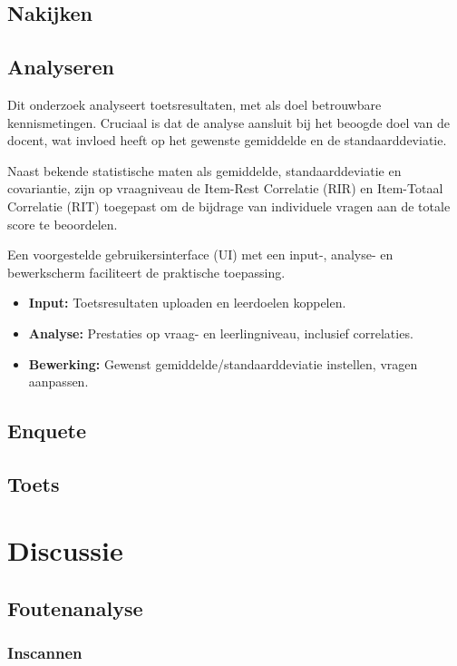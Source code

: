 \documentclass[12pt]{article}
\begin{document}
\subsection{Nakijken}


\subsection{Analyseren}
\begin{multicols}{2}
Dit onderzoek analyseert toetsresultaten, met als doel betrouwbare kennismetingen. Cruciaal is dat de analyse aansluit bij het beoogde doel van de docent, wat invloed heeft op het gewenste gemiddelde en de standaarddeviatie.

Naast bekende statistische maten als gemiddelde, standaarddeviatie en covariantie, zijn op vraagniveau de Item-Rest Correlatie (RIR) en Item-Totaal Correlatie (RIT) toegepast om de bijdrage van individuele vragen aan de totale score te beoordelen.

Een voorgestelde gebruikersinterface (UI) met een input-, analyse- en bewerkscherm faciliteert de praktische toepassing. 
\begin{itemize}
    \item \textbf{Input:} Toetsresultaten uploaden en leerdoelen koppelen.
    \item \textbf{Analyse:} Prestaties op vraag- en leerlingniveau, inclusief correlaties.
    \item \textbf{Bewerking:} Gewenst gemiddelde/standaarddeviatie instellen, vragen aanpassen.
\end{itemize}
\end{multicols}
\subsection{Enquete}


\subsection{Toets}

\pagebreak
\section{Discussie}
\subsection{Foutenanalyse}
\subsubsection{Inscannen}
\end{document}
